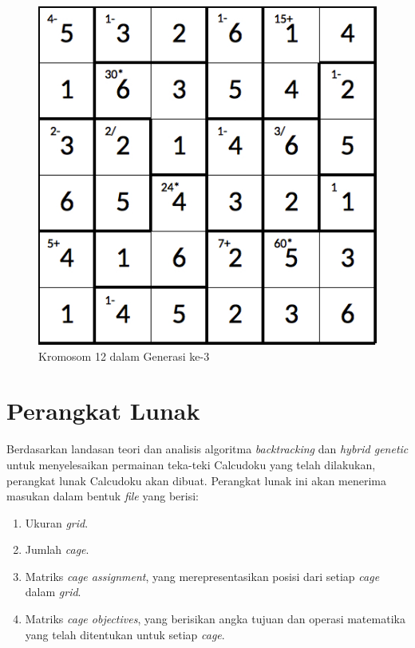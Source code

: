 \begin{figure}
\centering
\captionsetup{justification=centering}
\includegraphics[scale=0.333]{Gambar/hybridgenetic/Generation3Chromosome12}
\caption[Kromosom 12 dalam Generasi ke-3]{Kromosom 12 dalam Generasi ke-3}
\label{fig:analisisg3k12}
\end{figure}

\clearpage

\section{Perangkat Lunak}
\label{sec:analisispl}

Berdasarkan landasan teori dan analisis algoritma \textit{backtracking} dan \textit{hybrid genetic} untuk menyelesaikan permainan teka-teki Calcudoku yang telah dilakukan, perangkat lunak Calcudoku akan dibuat. Perangkat lunak ini akan menerima masukan dalam bentuk \textit{file} yang berisi:

\begin{enumerate}
\item Ukuran \textit{grid}.
\item Jumlah \textit{cage}.
\item Matriks \textit{cage assignment}, yang merepresentasikan posisi dari setiap \textit{cage} dalam \textit{grid}.
\item Matriks \textit{cage objectives}, yang berisikan angka tujuan dan operasi matematika yang telah ditentukan untuk setiap \textit{cage}.
\end{enumerate}


